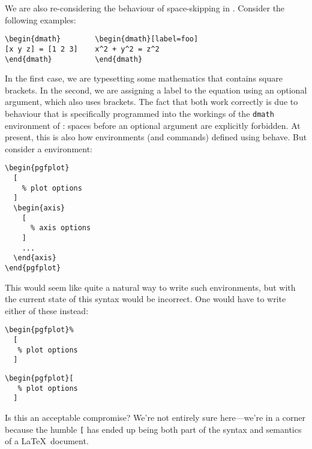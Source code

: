 \documentclass{ltnews}
\begin{document}
We are also re-considering the behaviour of space-skipping in .
Consider the following examples:
\begin{verbatim}
\begin{dmath}        \begin{dmath}[label=foo]
[x y z] = [1 2 3]    x^2 + y^2 = z^2
\end{dmath}          \end{dmath}
\end{verbatim}
In the first case, we are typesetting some mathematics that contains square brackets.
In the second, we are assigning a label to the equation using an optional argument, which also uses  brackets.
The fact that both work correctly is due to behaviour that is specifically programmed into the workings of the \texttt{dmath} environment of : spaces before an optional argument are explicitly forbidden.
At present, this is also how environments (and commands) defined using  behave.
But consider a  environment:
\begin{verbatim}
\begin{pgfplot}
  [
    % plot options
  ]
  \begin{axis}
    [
      % axis options
    ]
    ...
  \end{axis}
\end{pgfplot}
\end{verbatim}
This would seem like quite a natural way to write such environments, but with the current state of  this syntax would be incorrect. One would have to write either of these instead:
\begin{multicols}{2}
\begin{verbatim}
\begin{pgfplot}%
  [
   % plot options
  ]
\end{verbatim}
\begin{verbatim}
\begin{pgfplot}[
   % plot options
  ]
\end{verbatim}
\end{multicols}
Is this an acceptable compromise?
We're not entirely sure here---we're in a corner because the humble \texttt{[} has ended up being both part of the syntax and semantics of a \LaTeX\ document.

\end{document}
